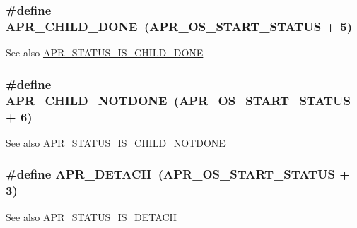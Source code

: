 \subsubsection[{\texorpdfstring{A\+P\+R\+\_\+\+C\+H\+I\+L\+D\+\_\+\+D\+O\+NE}{APR_CHILD_DONE}}]{\setlength{\rightskip}{0pt plus 5cm}\#define A\+P\+R\+\_\+\+C\+H\+I\+L\+D\+\_\+\+D\+O\+NE~({\bf A\+P\+R\+\_\+\+O\+S\+\_\+\+S\+T\+A\+R\+T\+\_\+\+S\+T\+A\+T\+US} + 5)}\hypertarget{group___a_p_r___error_ga2a78375cab66b8c1a4e06329e0cfcaf4}{}\label{group___a_p_r___error_ga2a78375cab66b8c1a4e06329e0cfcaf4}
\begin{DoxySeeAlso}{See also}
\hyperlink{group___a_p_r___s_t_a_t_u_s___i_s_gaa756a35c5bce65fdeecaa34ac600c58b}{A\+P\+R\+\_\+\+S\+T\+A\+T\+U\+S\+\_\+\+I\+S\+\_\+\+C\+H\+I\+L\+D\+\_\+\+D\+O\+NE} 
\end{DoxySeeAlso}
\subsubsection[{\texorpdfstring{A\+P\+R\+\_\+\+C\+H\+I\+L\+D\+\_\+\+N\+O\+T\+D\+O\+NE}{APR_CHILD_NOTDONE}}]{\setlength{\rightskip}{0pt plus 5cm}\#define A\+P\+R\+\_\+\+C\+H\+I\+L\+D\+\_\+\+N\+O\+T\+D\+O\+NE~({\bf A\+P\+R\+\_\+\+O\+S\+\_\+\+S\+T\+A\+R\+T\+\_\+\+S\+T\+A\+T\+US} + 6)}\hypertarget{group___a_p_r___error_ga00bba31c29774cce3e72a31f88610340}{}\label{group___a_p_r___error_ga00bba31c29774cce3e72a31f88610340}
\begin{DoxySeeAlso}{See also}
\hyperlink{group___a_p_r___s_t_a_t_u_s___i_s_ga86190a4a2c04bbbbedc2491bb93ab432}{A\+P\+R\+\_\+\+S\+T\+A\+T\+U\+S\+\_\+\+I\+S\+\_\+\+C\+H\+I\+L\+D\+\_\+\+N\+O\+T\+D\+O\+NE} 
\end{DoxySeeAlso}
\subsubsection[{\texorpdfstring{A\+P\+R\+\_\+\+D\+E\+T\+A\+CH}{APR_DETACH}}]{\setlength{\rightskip}{0pt plus 5cm}\#define A\+P\+R\+\_\+\+D\+E\+T\+A\+CH~({\bf A\+P\+R\+\_\+\+O\+S\+\_\+\+S\+T\+A\+R\+T\+\_\+\+S\+T\+A\+T\+US} + 3)}\hypertarget{group___a_p_r___error_gab3f8849983a52f6558016303fb4f5cff}{}\label{group___a_p_r___error_gab3f8849983a52f6558016303fb4f5cff}
\begin{DoxySeeAlso}{See also}
\hyperlink{group___a_p_r___s_t_a_t_u_s___i_s_ga2b4142665f8b935db158ec2edc3a9be0}{A\+P\+R\+\_\+\+S\+T\+A\+T\+U\+S\+\_\+\+I\+S\+\_\+\+D\+E\+T\+A\+CH} 
\end{DoxySeeAlso}
